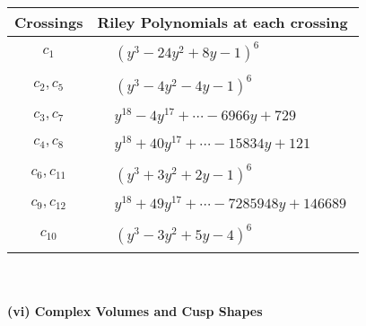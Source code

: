 \documentclass[1p]{elsarticle_modified}
\theoremstyle{definition}
\begin{document}
\begin{tabular}{m{50pt}|m{274pt}}
Crossings & \hspace{64pt}Riley Polynomials at each crossing \\
\hline $$\begin{aligned}c_{1}\end{aligned}$$&$\begin{aligned}
&(y^3-24 y^2+8 y-1)^6
\end{aligned}$\\
\hline $$\begin{aligned}c_{2},c_{5}\end{aligned}$$&$\begin{aligned}
&(y^3-4 y^2-4 y-1)^6
\end{aligned}$\\
\hline $$\begin{aligned}c_{3},c_{7}\end{aligned}$$&$\begin{aligned}
&y^{18}-4 y^{17}+\cdots-6966 y+729
\end{aligned}$\\
\hline $$\begin{aligned}c_{4},c_{8}\end{aligned}$$&$\begin{aligned}
&y^{18}+40 y^{17}+\cdots-15834 y+121
\end{aligned}$\\
\hline $$\begin{aligned}c_{6},c_{11}\end{aligned}$$&$\begin{aligned}
&(y^3+3 y^2+2 y-1)^6
\end{aligned}$\\
\hline $$\begin{aligned}c_{9},c_{12}\end{aligned}$$&$\begin{aligned}
&y^{18}+49 y^{17}+\cdots-7285948 y+146689
\end{aligned}$\\
\hline $$\begin{aligned}c_{10}\end{aligned}$$&$\begin{aligned}
&(y^3-3 y^2+5 y-4)^6
\end{aligned}$\\
\hline
\end{tabular}\\~\\
\newpage\flushleft \textbf{(vi) Complex Volumes and Cusp Shapes}
\end{document}
